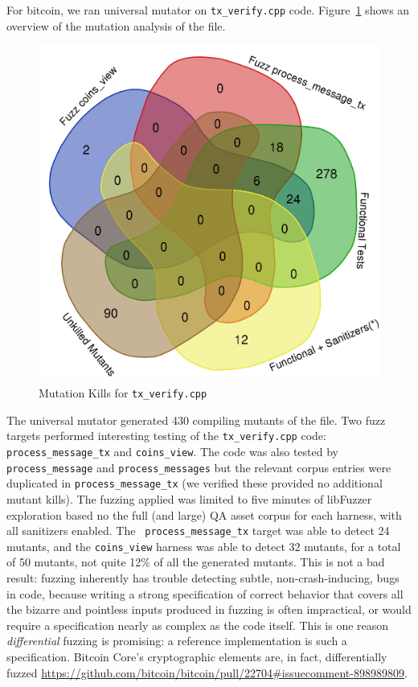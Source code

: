 \begin{sloppypar}

For bitcoin, we ran universal mutator on {\tt tx\_verify.cpp} code. 
Figure~\ref{kills} shows an overview of the mutation analysis of the file.

\begin{figure}
\vspace{2mm}
\includegraphics[width=0.9\columnwidth]{kill_pre_valgrind.png}
\caption{Mutation Kills for {\tt tx\_verify.cpp}}
\label{kills}
\end{figure}

The universal mutator generated 430 compiling mutants of the file.
Two fuzz targets performed interesting testing of the {\tt tx\_verify.cpp} code:
{\tt process\_message\_tx} and {\tt coins\_view}.  The code was also
tested by {\tt process\_message} and {\tt process\_messages} but the
relevant corpus entries were duplicated in {\tt process\_message\_tx}
(we verified these provided no additional mutant kills).  The fuzzing
applied was limited to five minutes of libFuzzer exploration based no
the full (and large) QA asset corpus for each harness, with all
sanitizers enabled.  The {\tt
  process\_message\_tx} target was able to detect 24 mutants, and the
{\tt coins\_view} harness was able to detect 32 mutants, for a total
of 50 mutants, not quite 12\% of all the generated mutants.  This is
not a bad result: fuzzing inherently has trouble detecting subtle,
non-crash-inducing, bugs in code, because writing a strong specification of
correct behavior that covers all the bizarre and pointless inputs
produced in fuzzing is often impractical, or would require a
specification nearly as complex as the code itself.  This is one
reason \emph{differential} fuzzing is promising: a reference
implementation is such a specification.  Bitcoin Core's cryptographic
elements are, in fact, differentially fuzzed
\url{https://github.com/bitcoin/bitcoin/pull/22704#issuecomment-898989809}.
\end{sloppypar}


